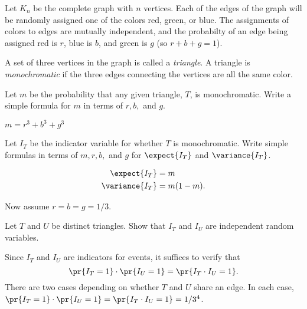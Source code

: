 \documentclass[quiz]{mcs}
\begin{document}
\begin{problem}
Let $K_n$ be the complete graph with $n$ vertices.  Each of the edges of
the graph will be randomly assigned one of the colors red, green, or blue.
The assignments of colors to edges are mutually independent, and the
probabilty of an edge being assigned red is $r$, blue is $b$, and green is
$g$ (so $r+b+g=1$).

A set of three vertices in the graph is called a \emph{triangle}.  A
triangle is \emph{monochromatic} if the three edges connecting the vertices
are all the same color.

\bparts 

\ppart[3] Let $m$ be the probability that any given triangle, $T$, is
monochromatic.  Write a simple formula for $m$ in terms of $r,b,$ and $g$.

\exambox{2.0in}{0.5in}{-0.4in}
\examspace[0.5in]

\begin{solution}
$m = r^3+b^3 +g^3$
\end{solution}

\ppart[4] Let $I_T$ be the indicator variable for whether $T$ is
monochromatic.  Write simple formulas in terms of $m,r,b,$ and $g$ for
$\expect{I_T}$ and $\variance{I_T}$.

\exambox{2.0in}{0.5in}{-0.8in}
\examspace[1.0in]

\begin{solution}
\begin{align*}
\expect{I_T} & = m\\
\variance{I_T} & = m(1-m).
\end{align*}
\end{solution}

\eparts

\examspace

\begin{center}
{\large Now assume $r=b=g = 1/3$.}
\end{center}

\bparts

\ppart[7] Let $T$ and $U$ be distinct triangles.  Show that $I_T$ and $I_U$
are independent random variables.

\examspace[6.0in]
\begin{solution}

Since $I_T$ and $I_U$ are indicators for events, it suffices to verify that
\[
\pr{I_T = 1}\cdot \pr{I_U = 1} = \pr{I_T\cdot I_U =1}.
\]
There are two cases depending on whether $T$ and $U$ share an edge.  In each
case, $\pr{I_T = 1}\cdot \pr{I_U = 1} = \pr{I_T\cdot I_U =1} = 1/3^4$.


\end{solution}
\end{problem}
\end{document}
